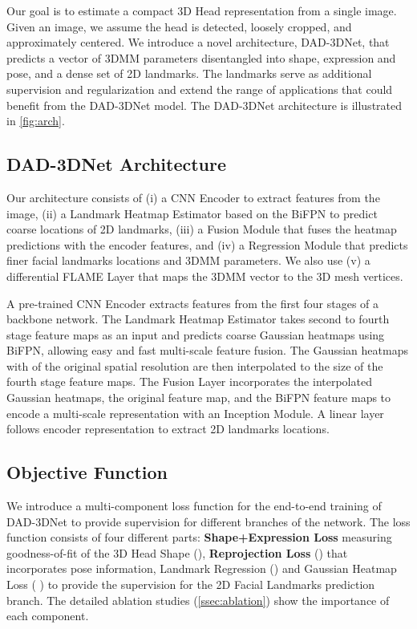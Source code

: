 \documentclass[10pt,twocolumn,letterpaper]{article}
\begin{document}
Our goal is to estimate a compact 3D Head representation from a single image. Given an image, we assume the head is detected, loosely cropped, and approximately centered. We introduce a novel architecture, DAD-3DNet, that predicts a vector of 3DMM parameters disentangled into shape, expression and pose, and a dense set of 2D landmarks.
The landmarks serve as additional supervision and regularization and extend the range of applications that could benefit from the DAD-3DNet model. The DAD-3DNet architecture is illustrated in \cref{fig:arch}.

\subsection{DAD-3DNet Architecture}

Our architecture consists of (i) a CNN Encoder to extract features from the image, (ii) a Landmark Heatmap Estimator based on the BiFPN \cite{EfficientDet} to predict coarse locations of 2D landmarks, (iii) a Fusion Module that fuses the heatmap predictions with the encoder features, and (iv) a Regression Module that predicts finer facial landmarks locations and 3DMM parameters. 
We also use (v) a differential FLAME Layer that maps the 3DMM vector to the 3D mesh vertices. 

A pre-trained CNN Encoder extracts features from the first four stages of a backbone network. 
The Landmark Heatmap Estimator takes second to fourth stage feature maps as an input and predicts coarse Gaussian heatmaps using BiFPN, allowing easy and fast multi-scale feature fusion. The Gaussian heatmaps with  of the original spatial resolution are then interpolated to the size of the fourth stage feature maps. 
The Fusion Layer incorporates the interpolated Gaussian heatmaps, the original feature map, and the BiFPN feature maps to encode a multi-scale representation with an Inception Module. 
A linear layer follows encoder representation to extract 2D landmarks locations. 

\subsection{Objective Function}\label{ssec:loss}

We introduce a multi-component loss function for the end-to-end training of DAD-3DNet to provide supervision for different branches of the network. The loss function consists of four different parts: \textbf{Shape+Expression Loss} measuring goodness-of-fit of the 3D Head Shape (), \textbf{Reprojection Loss} () that incorporates pose information, Landmark Regression () and Gaussian Heatmap Loss ( \cite{AWingLoss}) to provide the supervision for the 2D Facial Landmarks prediction branch. The detailed ablation studies (\cref{ssec:ablation}) show the importance of each component.
\end{document}
